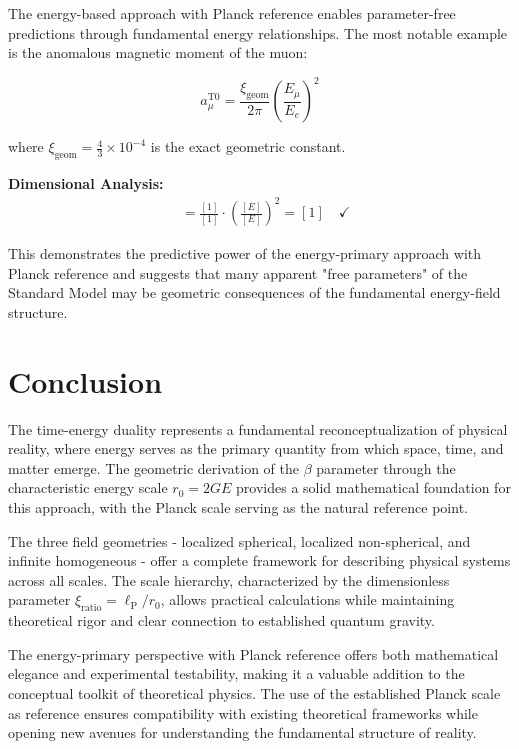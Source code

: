 \documentclass[12pt,a4paper]{report}
\newcommand{\lP}{\ell_{\text{P}}}         %
\newcommand{\rzero}{r_0}                  %
\newcommand{\xigeom}{\xi_{\text{geom}}}   %
\newcommand{\xirat}{\xi_{\text{ratio}}}   %
\begin{document}
	The energy-based approach with Planck reference enables parameter-free predictions through fundamental energy relationships. The most notable example is the anomalous magnetic moment of the muon:
	
	\begin{equation}
		a_\mu^{\text{T0}} = \frac{\xigeom}{2\pi} \left(\frac{E_\mu}{E_e}\right)^2
	\end{equation}
	
	where $\xigeom = \frac{4}{3} \times 10^{-4}$ is the exact geometric constant.
	
	\textbf{Dimensional Analysis:}
	\begin{align}
		[a_\mu^{\text{T0}}] &= \frac{[1]}{[1]} \cdot \left(\frac{[E]}{[E]}\right)^2 = [1] \quad \checkmark
	\end{align}
	
	This demonstrates the predictive power of the energy-primary approach with Planck reference and suggests that many apparent "free parameters" of the Standard Model may be geometric consequences of the fundamental energy-field structure.
	
	\section{Conclusion}\label{sec:conclusion}
	
	The time-energy duality represents a fundamental reconceptualization of physical reality, where energy serves as the primary quantity from which space, time, and matter emerge. The geometric derivation of the $\beta$ parameter through the characteristic energy scale $\rzero = 2GE$ provides a solid mathematical foundation for this approach, with the Planck scale serving as the natural reference point.
	
	The three field geometries - localized spherical, localized non-spherical, and infinite homogeneous - offer a complete framework for describing physical systems across all scales. The scale hierarchy, characterized by the dimensionless parameter $\xirat = \lP/\rzero$, allows practical calculations while maintaining theoretical rigor and clear connection to established quantum gravity.
	
	The energy-primary perspective with Planck reference offers both mathematical elegance and experimental testability, making it a valuable addition to the conceptual toolkit of theoretical physics. The use of the established Planck scale as reference ensures compatibility with existing theoretical frameworks while opening new avenues for understanding the fundamental structure of reality.
	
\end{document}
